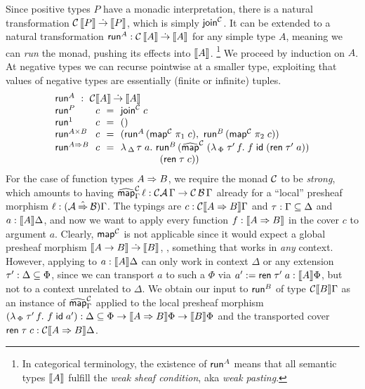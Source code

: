 \documentclass[sigplan,screen,fleqn,review]{acmart} %
\begin{document}
Since positive types $P$ have a monadic interpretation, there is a
natural transformation $\C\,\den P \todot \den P$, which is simply
$\tjoin[\C]$.  It
can be extended to a
natural transformation $\trun^A : \C\,\den A \todot \den A$ for any simple
type $A$, meaning we can \emph{run} the monad,
pushing its effects into $\den A$.%
\footnote{In categorical terminology, the existence of
$\trun^A$ means that
all semantic types $\den{A}$ fulfill the \emph{weak sheaf condition},
aka \emph{weak pasting}.}
We proceed by induction on $A$.
At negative types we can recurse pointwise at a smaller type,
exploiting that values of negative types are essentially
(finite or infinite) tuples.
\[
\begin{array}{l@{~~}l@{~~}c@{~~}l}%
  \multicolumn 4 l {\trun^A ~:~ \C \den A \todot \den A} \\
  \trun^P & c & = & \tjoin[\C]\;c \\
  \trun^{\tyone} & c & = & \ttempty
    \\
  \trun^{A \times B} & c & = &
      (\trun^A\,(\tmap[\C]\;\pi_1\;c),\
       \trun^B\,(\tmap[\C]\;\pi_2\;c))
  \\
  \trun^{A \To B} & c  & = & \lambda\,_\Delta \,\tau \; a. \ \trun^B\,
      (\stmap[\C]\;(\lambda\,_\Phi\;\tau'\,f.\;f\;\tid\;(\tren\;\tau'\;a))
  \\ &&& \qquad \qquad (\tren\;\tau\;c))
  \\
\end{array}
\]
For the case of function types $A \To B$, we require the monad $\C$ to be
\emph{strong}, which amounts to having
$\stmap[\C]_\Gamma\, \ell : \C\A\,\Gamma \to \C\,\B\,\Gamma$ already for
a ``local'' presheaf morphism $\ell : (\A \hatto \B)\Gamma$.
The typings are
$c : \C \den{A \To B} \Gamma$ and
$\tau : \Gamma \sublist \Delta$ and
$a : \den A \Delta$, and now we want to apply every function
$f : \den{A \To B}$ in the cover $c$ to argument $a$.  Clearly,
$\tmap[\C]$ is not applicable since it would expect a
global presheaf morphism
$\den{A \to B} \todot \den B$, \ie, something that works in \emph{any}
context.  However, applying to $a : \den A \Delta$ can only work in
context $\Delta$ or any extension $\tau' : \Delta \sublist \Phi$,
since we can transport $a$ to such a $\Phi$ via
$a' := \tren\; \tau'\; a : \den A \Phi$, but not to a context unrelated to
$\Delta$.  We obtain our input to $\trun^B$ of type $\C \den B \Gamma$
as an instance of $\stmap[\C]_\Gamma$ applied to the local presheaf morphism
$(\lambda\,_\Phi \; \tau'\, f. \  f\;\tid\;a') :
\Delta \sublist \Phi \to  \den{A \To B}\Phi \to \den B \Phi$
and the transported cover $\tren\;\tau\;c : \C\den{A \To B}\Delta$.
\end{document}
